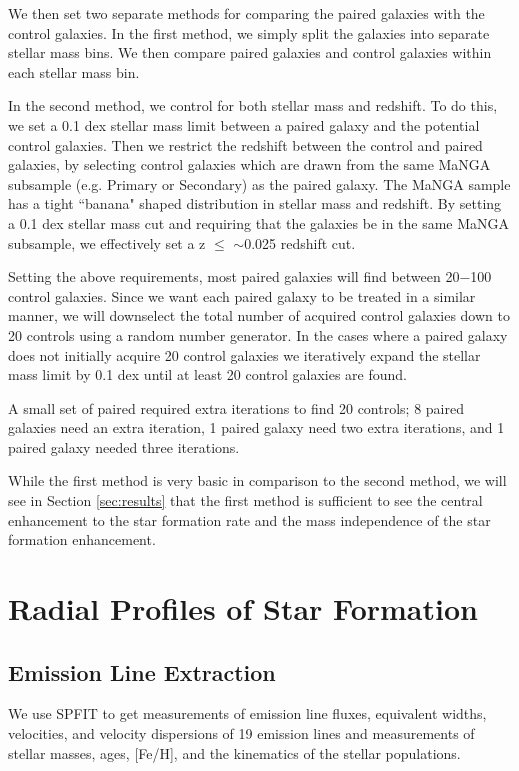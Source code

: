 \documentclass[iop,revtex4,twocolumn,apj,numberedappendix,appendixfloats]{emulateapj}
\begin{document}
We then set two separate methods for comparing the paired galaxies with the control galaxies. In the first method, we simply split the galaxies into separate stellar mass bins. We then compare paired galaxies and control galaxies within each stellar mass bin. 

In the second method, we control for both stellar mass and redshift. To do this, we set a 0.1 dex stellar mass limit between a paired galaxy and the potential control galaxies. Then we restrict the redshift between the control and paired galaxies, by selecting control galaxies which are drawn from the same MaNGA subsample (e.g. Primary or Secondary) as the paired galaxy. The MaNGA sample has a tight ``banana" shaped distribution in stellar mass and redshift. By setting a 0.1 dex stellar mass cut and requiring that the galaxies be in the same MaNGA subsample, we effectively set a z $\le$ $\sim$0.025 redshift cut. 

Setting the above requirements, most paired galaxies will find between 20$-$100 control galaxies. Since we want each paired galaxy to be treated in a similar manner, we will downselect the total number of acquired control galaxies down to 20 controls using a random number generator. In the cases where a paired galaxy does not initially acquire 20 control galaxies we iteratively expand the stellar mass limit by 0.1 dex until at least 20 control galaxies are found. 

A small set of paired required extra iterations to find 20 controls; 8 paired galaxies need an extra iteration, 1 paired galaxy need two extra iterations, and 1 paired galaxy needed three iterations.

While the first method is very basic in comparison to the second method, we will see in Section \ref{sec:results} that the first method is sufficient to see the central enhancement to the star formation rate and the mass independence of the star formation enhancement.

\section{Radial Profiles of Star Formation}\label{sec:analysis}

\subsection{Emission Line Extraction}

We use {\sc SPFIT} to get measurements of emission line fluxes, equivalent widths, velocities, and velocity dispersions of 19 emission lines and measurements of stellar masses, ages, [Fe/H], and the kinematics of the stellar populations. 
\end{document}
